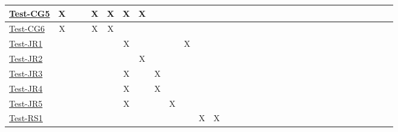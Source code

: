 \documentclass[12pt, titlepage]{article}
\begin{document}
\begin{landscape}
\begin{table}[H]
\begin{adjustwidth}{-0.1in}{-1in}
{\begin{tabular}{c|c|c|c|c|c|c|c|c|c|c|c|c|c|c|c|c|l|l|l|l|l|l|l|l|l|l|l|l|l|l|l|l|}
\multicolumn{1}{|l|}{\hyperref[itm:Test-CG5]{Test-CG5}}   &       X      &              &             &      X       &      X       &       X       &      X        &             &              &              &             &             &              &              &              &                & & & &  &\\ \hline
\multicolumn{1}{|l|}{\hyperref[itm:Test-CG6]{Test-CG6}}   &       X       &              &              &     X        &     X         &             &             &             &              &              &              &             &              &              &              &                & & & &  &\\ \hline
\multicolumn{1}{|l|}{\hyperref[itm:Test-JR1]{Test-JR1}}   &             &             &             &              &             &       X       &              &             &              &       X       &              &              &              &              &              &                & & & & &\\ \hline
\multicolumn{1}{|l|}{\hyperref[itm:Test-JR2]{Test-JR2}}   &             &              &             &             &             &              &        X      &             &              &              &             &             &              &              &              &                & & & & & \\ \hline
\multicolumn{1}{|l|}{\hyperref[itm:Test-JR3]{Test-JR3}}   &             &             &             &              &             &       X       &              &     X        &              &              &              &             &              &              &              &                & & & & & \\ \hline
\multicolumn{1}{|l|}{\hyperref[itm:Test-JR4]{Test-JR4}}   &             &             &             &              &             &       X       &              &     X        &              &              &             &             &              &              &              &                & & & & & \\ \hline
\multicolumn{1}{|l|}{\hyperref[itm:Test-JR5]{Test-JR5}}   &             &              &             &             &             &       X       &              &             &       X       &              &             &             &              &              &              &                & & & & & \\ \hline
\multicolumn{1}{|l|}{\hyperref[itm:Test-RS1]{Test-RS1}}   &             &             &             &              &             &              &              &             &              &              &        X      &       X       &              &              &              &                & & & & & \\ \hline

\end{tabular}}
\end{adjustwidth}
\end{table}
\end{landscape}
\end{document}
